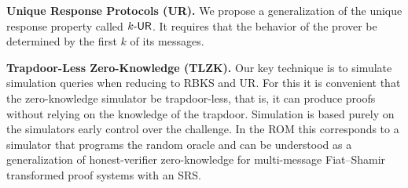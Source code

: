 \documentclass[11pt]{llncs}
\newcommand{\oursubsub}[1] {\smallskip\noindent\textbf{#1}}
\begin{document}

\oursubsub{Unique Response Protocols (UR).}  
We propose a generalization of the unique response property called ${k\text{-}\mathsf{UR}}$. It requires that the behavior of the prover be determined by the first
$k$ of its messages. 

\oursubsub{Trapdoor-Less Zero-Knowledge (TLZK).} 
Our key technique is to simulate simulation queries when reducing to RBKS and UR. For this it is convenient that the zero-knowledge simulator be trapdoor-less, that is, it can produce proofs without relying on the
knowledge of the trapdoor. Simulation is based purely on the simulators early control over the challenge. 
%
In the ROM this corresponds to a simulator that programs the random oracle and can be understood as a generalization of honest-verifier zero-knowledge for multi-message Fiat--Shamir transformed proof systems with an
SRS. 
\end{document}
